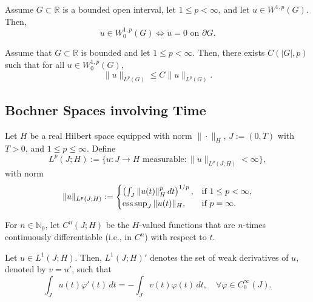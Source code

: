 \begin{proposition}
Assume $G \subset \mathbb{R}$ is a bounded open interval, let $1 \leq p < \infty$, and let $u \in W^{1,p}(G)$. Then,
\[
u \in W^{1,p}_0(G) \Leftrightarrow \tilde{u} = 0 \text{ on } \partial G.
\]
\end{proposition}

\begin{theorem}
Assume that $G \subset \mathbb{R}$ is bounded and let $1 \leq p < \infty$. Then, there exists $C(|G|, p)$ such that for all $u \in W^{1,p}_0(G)$,
\[
\|u\|_{L^p(G)} \leq C \|u\|_{L^p(G)}.
\]
\end{theorem}

\subsection{Bochner Spaces involving Time}

Let $H$ be a real Hilbert space equipped with norm $\| \cdot \|_H$, $J := (0, T)$ with $T > 0$, and $1 \leq p \leq \infty$. Define
\[
L^p(J; H) := \{ u: J \to H \text{ measurable} : \|u\|_{L^p(J;H)} < \infty \},
\]
with norm
\[
\|u\|_{L^p(J;H)} :=
\begin{cases}
\left( \int_J \|u(t)\|_H^p \, dt \right)^{1/p}, & \text{if } 1 \leq p < \infty, \\
\operatorname*{ess\,sup}_{J} \|u(t)\|_H, & \text{if } p = \infty.
\end{cases}
\]

For $n \in \mathbb{N}_0$, let $C^n(J; H)$ be the $H$-valued functions that are $n$-times continuously differentiable (i.e., in $C^n$) with respect to $t$.

\begin{definition}
Let $u \in L^1(J; H)$. Then, $L^1(J; H)'$ denotes the set of weak derivatives of $u$, denoted by $v = u'$, such that
\[
\int_J u(t) \varphi'(t) \, dt = - \int_J v(t) \varphi(t) \, dt, \quad \forall \varphi \in C_0^\infty(J).
\]
\end{definition}
